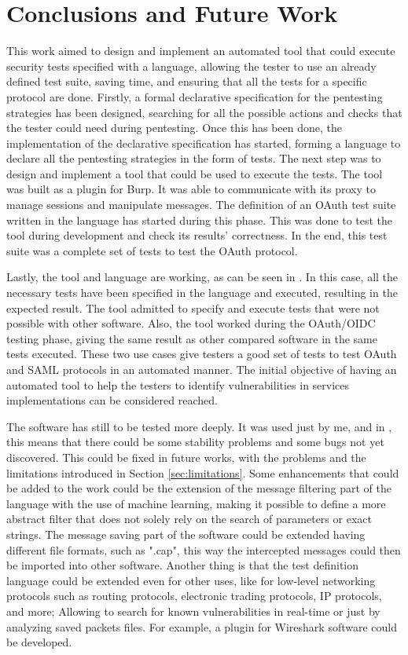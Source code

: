 \chapter{Conclusions and Future Work}
\label{chap:Conclusions}
This work aimed to design and implement an automated tool that could execute security tests specified with a language, allowing the tester to use an already defined test suite, saving time, and ensuring that all the tests for a specific protocol are done. Firstly, a formal declarative specification for the pentesting strategies has been designed, searching for all the possible actions and checks that the tester could need during pentesting. Once this has been done, the implementation of the declarative specification has started, forming a language to declare all the pentesting strategies in the form of tests. The next step was to design and implement a tool that could be used to execute the tests. The tool was built as a plugin for Burp. It was able to communicate with its proxy to manage sessions and manipulate messages. The definition of an OAuth test suite written in the language has started during this phase. This was done to test the tool during development and check its results' correctness. In the end, this test suite was a complete set of tests to test the OAuth protocol.

Lastly, the tool and language are working, as can be seen in \cite{sofia_zanrosso}. In this case, all the necessary tests have been specified in the language and executed, resulting in the expected result. The tool admitted to specify and execute tests that were not possible with other software. Also, the tool worked during the OAuth/OIDC testing phase, giving the same result as other compared software in the same tests executed. These two use cases give testers a good set of tests to test OAuth and SAML protocols in an automated manner. The initial objective of having an automated tool to help the testers to identify vulnerabilities in services implementations can be considered reached. 

The software has still to be tested more deeply. It was used just by me, and in \cite{sofia_zanrosso}, this means that there could be some stability problems and some bugs not yet discovered. This could be fixed in future works, with the problems and the limitations introduced in Section \ref{sec:limitations}. Some enhancements that could be added to the work could be the extension of the message filtering part of the language with the use of machine learning, making it possible to define a more abstract filter that does not solely rely on the search of parameters or exact strings. The message saving part of the software could be extended having different file formats, such as ".cap", this way the intercepted messages could then be imported into other software.
Another thing is that the test definition language could be extended even for other uses, like for low-level networking protocols such as routing protocols, electronic trading protocols, IP protocols, and more; Allowing to search for known vulnerabilities in real-time or just by analyzing saved packets files. For example, a plugin for Wireshark software could be developed. 



